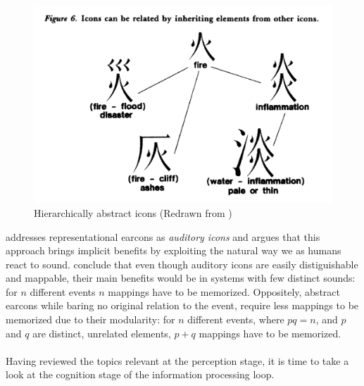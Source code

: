 \begin{figure}
	\centering
	\includegraphics[width=0.7\linewidth]{figures/placeholders/icons_tree_structure}
	\caption{Hierarchically abstract icons (Redrawn from \cite{blatter_earcons_1989})}
	\label{fig:iconstreestructure}
\end{figure}

\cite{gaver_sonicfinder:_1989} addresses representational earcons as \textit{auditory icons} and argues that this approach brings implicit benefits by exploiting the natural way we as humans react to sound. 
\cite{blattner_earcons_1989} conclude that even though auditory icons are easily distiguishable and mappable, their main benefits would be in systems with few distinct sounds: for $n$ different events $n$ mappings have to be memorized.
Oppositely, abstract earcons while baring no original relation to the event, require less mappings to be memorized due to their modularity: for $n$ different events, where $pq=n$, and $p$ and $q$ are distinct, unrelated elements, $p+q$ mappings have to be memorized.

\paragraph[Bridge]{}
Having reviewed the topics relevant at the perception stage, it is time to take a look at the cognition stage of the information processing loop.



